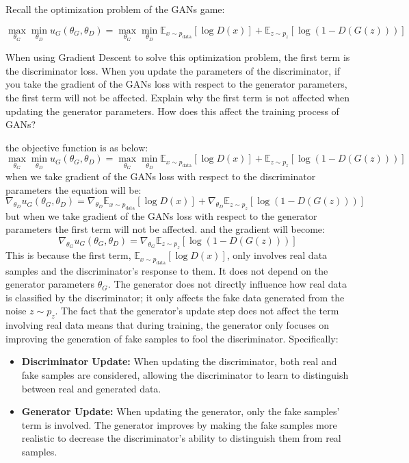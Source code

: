 Recall the optimization problem of the GANs game:

\[
\max_{\theta_G} \min_{\theta_D} u_G(\theta_G, \theta_D) = \max_{\theta_G} \min_{\theta_D} \mathbb{E}_{x \sim p_{\text{data}}} [\log D(x)] + \mathbb{E}_{z \sim p_z} [\log (1 - D(G(z)))]
\]

When using Gradient Descent to solve this optimization problem, the first term is the discriminator loss. When you update the parameters of the discriminator, if you take the gradient of the GANs loss with respect to the generator parameters, the first term will not be affected. Explain why the first term is not affected when updating the generator parameters. How does this affect the training process of GANs?
\begin{qsolve}
    \begin{qsolve}[]
        the objective function is as below:
        \[
        \max_{\theta_G} \min_{\theta_D} u_G(\theta_G, \theta_D) = \max_{\theta_G} \min_{\theta_D} \mathbb{E}_{x \sim p_{\text{data}}} [\log D(x)] + \mathbb{E}_{z \sim p_z} [\log (1 - D(G(z)))]
        \]
        when we take gradient of the GANs loss with respect to the discriminator parameters the equation will be:
        \[
            \nabla_{\theta_D} u_G(\theta_G, \theta_D) = \nabla_{\theta_D} \mathbb{E}_{x \sim p_{\text{data}}} [\log D(x)] + \nabla_{\theta_D} \mathbb{E}_{z \sim p_z} [\log (1 - D(G(z)))]
        \]
        \splitqsolve[\splitqsolve]
        but when we take gradient of the GANs loss with respect to the generator parameters the first term will not be affected. and the gradient will become:
        \[
            \nabla_{\theta_G} u_G(\theta_G, \theta_D) = \nabla_{\theta_G} \mathbb{E}_{z \sim p_z} [\log (1 - D(G(z)))]
        \]
        This is because the first term, $\mathbb{E}_{x \sim p_{\text{data}}} [\log D(x)]$, only involves real data samples and the discriminator's response to them. It does not depend on the generator parameters $\theta_G$. The generator does not directly influence how real data is classified by the discriminator; it only affects the fake data generated from the noise $z \sim p_z$.
        The fact that the generator's update step does not affect the term involving real data means that during training, the generator only focuses on improving the generation of fake samples to fool the discriminator. Specifically:

        \begin{itemize}
            \item \textbf{Discriminator Update:} When updating the discriminator, both real and fake samples are considered, allowing the discriminator to learn to distinguish between real and generated data.
            \item \textbf{Generator Update:} When updating the generator, only the fake samples' term is involved. The generator improves by making the fake samples more realistic to decrease the discriminator's ability to distinguish them from real samples.
        \end{itemize}


\end{qsolve}
\end{qsolve}
